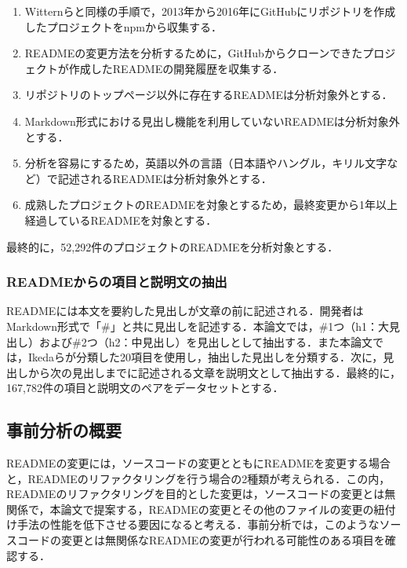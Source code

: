 \documentclass[submit]{ipsj}
\newcommand{\todo}[1]{\colorbox{yellow}{{\bf TODO}:}{\color{red} {\textbf{[#1]}}}}
\begin{document}
\begin{enumerate}
  \item
  Witternら\cite{Ikeda_EN_9}と同様の手順で，2013年から2016年にGitHubにリポジトリを作成したプロジェクトをnpmから収集する．

  \item
  READMEの変更方法を分析するために，GitHubからクローンできたプロジェクトが作成したREADMEの開発履歴を収集する．
  
  \item
  リポジトリのトップページ以外に存在するREADMEは分析対象外とする．

  \item
  Markdown形式における見出し機能を利用していないREADMEは分析対象外とする．

  \item
  分析を容易にするため，英語以外の言語（日本語やハングル，キリル文字など）で記述されるREADMEは分析対象外とする．

  \item
  成熟したプロジェクトのREADMEを対象とするため，最終変更から1年以上経過しているREADMEを対象とする．
  
\end{enumerate}

最終的に，52,292件のプロジェクトのREADMEを分析対象とする．


\subsubsection{READMEからの項目と説明文の抽出}
READMEには本文を要約した見出しが文章の前に記述される．開発者はMarkdown形式で「\#」と共に見出しを記述する．本論文では，\#1つ（h1：大見出し）および\#2つ（h2：中見出し）を見出しとして抽出する．また本論文では，Ikedaら\cite{Ikeda_README}が分類した20項目を使用し，抽出した見出しを分類する．次に，見出しから次の見出しまでに記述される文章を説明文として抽出する．最終的に，167,782件の項目と説明文のペアをデータセットとする．



\subsection{事前分析の概要}
READMEの変更には，ソースコードの変更とともにREADMEを変更する場合と，READMEのリファクタリングを行う場合の2種類が考えられる．この内，READMEのリファクタリングを目的とした変更は，ソースコードの変更とは無関係で，本論文で提案する，READMEの変更とその他のファイルの変更の紐付け手法の性能を低下させる要因になると考える．事前分析では，このようなソースコードの変更とは無関係なREADMEの変更が行われる可能性のある項目を確認する．
\end{document}
